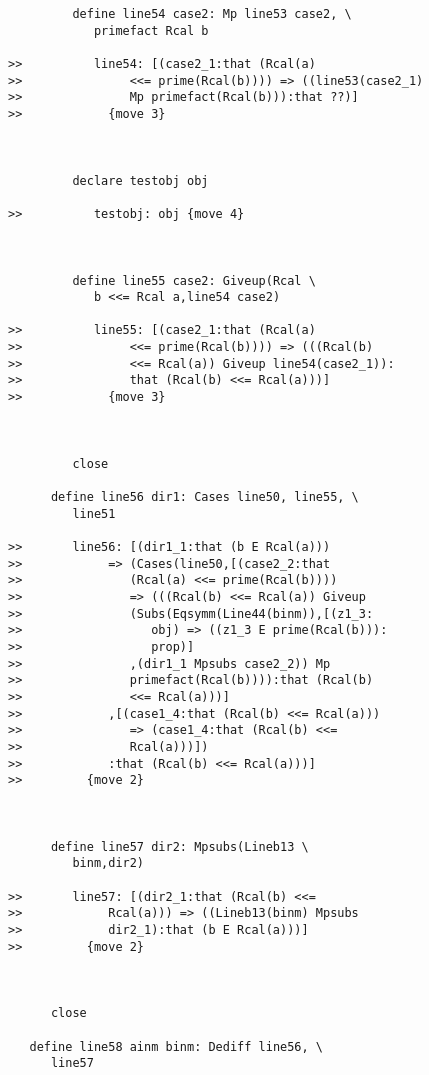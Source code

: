 \documentclass[12pt]{article}
\begin{document}
\begin{verbatim}
         define line54 case2: Mp line53 case2, \
            primefact Rcal b

>>          line54: [(case2_1:that (Rcal(a)
>>               <<= prime(Rcal(b)))) => ((line53(case2_1)
>>               Mp primefact(Rcal(b))):that ??)]
>>            {move 3}



         declare testobj obj

>>          testobj: obj {move 4}



         define line55 case2: Giveup(Rcal \
            b <<= Rcal a,line54 case2)

>>          line55: [(case2_1:that (Rcal(a)
>>               <<= prime(Rcal(b)))) => (((Rcal(b)
>>               <<= Rcal(a)) Giveup line54(case2_1)):
>>               that (Rcal(b) <<= Rcal(a)))]
>>            {move 3}



         close

      define line56 dir1: Cases line50, line55, \
         line51

>>       line56: [(dir1_1:that (b E Rcal(a)))
>>            => (Cases(line50,[(case2_2:that
>>               (Rcal(a) <<= prime(Rcal(b))))
>>               => (((Rcal(b) <<= Rcal(a)) Giveup
>>               (Subs(Eqsymm(Line44(binm)),[(z1_3:
>>                  obj) => ((z1_3 E prime(Rcal(b))):
>>                  prop)]
>>               ,(dir1_1 Mpsubs case2_2)) Mp
>>               primefact(Rcal(b)))):that (Rcal(b)
>>               <<= Rcal(a)))]
>>            ,[(case1_4:that (Rcal(b) <<= Rcal(a)))
>>               => (case1_4:that (Rcal(b) <<=
>>               Rcal(a)))])
>>            :that (Rcal(b) <<= Rcal(a)))]
>>         {move 2}



      define line57 dir2: Mpsubs(Lineb13 \
         binm,dir2)

>>       line57: [(dir2_1:that (Rcal(b) <<=
>>            Rcal(a))) => ((Lineb13(binm) Mpsubs
>>            dir2_1):that (b E Rcal(a)))]
>>         {move 2}



      close

   define line58 ainm binm: Dediff line56, \
      line57


\end{verbatim}
\end{document}
